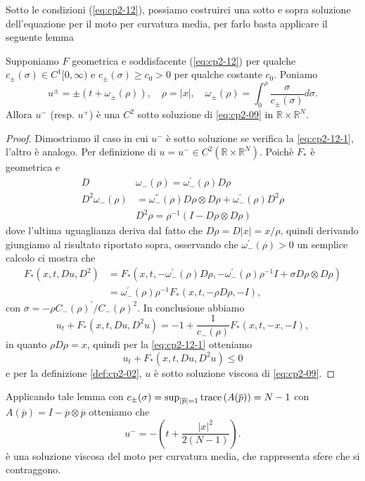 \begin{osservazione}
Sotto le condizioni (\hyperref[eq:cp2-12-1]{\ref{eq:cp2-12}\ped{$\pm$}}), possiamo costruirci una sotto e sopra soluzione dell'equazione per il moto per curvatura media, per farlo basta applicare il seguente lemma
\begin{lemma}
Supponiamo $F$ geometrica e soddisfacente (\hyperref[eq:cp2-12-1]{\ref{eq:cp2-12}\ped{$\pm$}}) per qualche $c_{\pm}(\sigma)\in C^1[0,\infty)$ e $c_{\pm}(\sigma)\geq c_0>0$ per qualche costante $c_0$. Poniamo \[
u^{\pm}=\pm(t+\omega_{\pm}(\rho)),\quad \rho=|x|,\quad\omega_{\pm}(\rho)=\int_0^{\rho}\frac{\sigma}{c_{\pm}(\sigma)}d\sigma.
\]
Allora $u^-$ (resp. $u^+$) è una $C^2$ sotto soluzione di \eqref{eq:cp2-09} in $\mathbb{R}\times\mathbb{R}^N$.
\end{lemma}
\begin{proof}
Dimostriamo il caso in cui $u^-$ è sotto soluzione se verifica la \eqref{eq:cp2-12-1}, l'altro è analogo. Per definizione di $u=u^-\in C^2(\mathbb{R}\times\mathbb{R}^N)$. Poichè $F_*$ è geometrica e
\[
\begin{aligned}
D&\omega_{-}(\rho)=\omega_{-}^{'}(\rho)D\rho \\
D^2\omega_{-}(\rho)&=\omega_{-}^{''}(\rho)D\rho\otimes D\rho+\omega_{-}^{'}(\rho)D^2\rho \\
&D^2\rho = \rho^{-1}(I-D\rho\otimes D\rho)
\end{aligned}
\]
dove l'ultima uguaglianza deriva dal fatto che $D\rho = D|x| = x/\rho$, quindi derivando giungiamo al risultato riportato sopra, osservando che $\omega_{-}^{'}(\rho)> 0$ un semplice calcolo ci mostra che
\[
\begin{aligned}
F_*(x,t,Du,D^2) &= F_{*}(x,t,-\omega_{-}^{'}(\rho)D\rho,-\omega_{-}^{'}(\rho)\rho^{-1}I+\sigma D\rho\otimes D\rho) \\
&=\omega_{-}^{'}(\rho)\rho^{-1}F_*(x,t,-\rho D\rho,-I),
\end{aligned}
\] 
con $\sigma = -\rho C_{-}(\rho)^{'}/C_{-}(\rho)^2$.
In conclusione abbiamo
\[
u_t + F_*(x,t,Du,D^2u) = -1 + \frac{1}{c_{-}(\rho)}F_*(x,t,-x,-I),
\]
in quanto  $\rho D\rho=x$, quindi per la \eqref{eq:cp2-12-1} otteniamo
\[
u_t + F_*(x,t,Du,D^2u)\leq 0
\]
e per la definizione \ref{def:cp2-02}, $u$ è sotto soluzione viscosa di \eqref{eq:cp2-09}.
\end{proof}
Applicando tale lemma con $c_{\pm}(\sigma)=\sup_{|\overline{p}|=1}\operatorname{trace}\left(A(\overline{p})\right)=N-1$ con $A(\overline{p})=I-\overline{p}\otimes\overline{p}$ otteniamo che
\[
u^{-}=-\left(t+\frac{|x|^2}{2(N-1)}\right).
\]
è una soluzione viscosa del moto per curvatura media, che rappresenta sfere che si contraggono. 
\end{osservazione}
